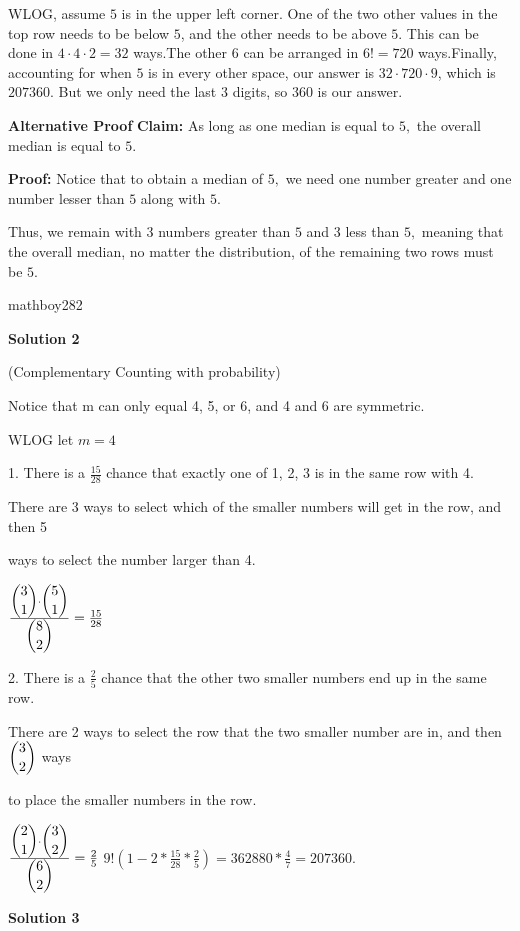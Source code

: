 \begin{enumerate}
 WLOG, assume $5$ is in the upper left corner. One of the two other values in the top row needs to be below $5$, and the other needs to be above $5$. This can be done in $4\cdot4\cdot2=32$ ways.The other $6$ can be arranged in $6!=720$ ways.Finally, accounting for when $5$ is in every other space, our answer is $32\cdot720\cdot9$, which is $207360$. But we only need the last $3$ digits, so $\boxed{360}$ is our answer.

 \textbf{Alternative Proof} \textbf{Claim:} As long as one median is equal to $5,$ the overall median is equal to $5.$

 \textbf{Proof:} Notice that to obtain a median of $5,$ we need one number greater and one number lesser than $5$ along with $5.$

 Thus, we remain with 3 numbers greater than $5$ and 3 less than $5,$ meaning that the overall median, no matter the distribution, of the remaining two rows must be $5.$

 mathboy282

 



\textbf{Solution 2}

(Complementary Counting with probability)

 Notice that m can only equal 4, 5, or 6, and 4 and 6 are symmetric. 

 WLOG let $m=4$

 1. There is a $\frac{15}{28}$ chance that exactly one of 1, 2, 3 is in the same row with 4.

 There are 3 ways to select which of the smaller numbers will get in the row, and then 5 

 ways to select the number larger than 4.

 $\frac{\dbinom{3}{1}\cdot\dbinom{5}{1}}{\dbinom{8}{2}} = \frac{15}{28}$

 2. There is a $\frac{2}{5}$ chance that the other two smaller numbers end up in the same row.

 There are 2 ways to select the row that the two smaller number are in, and then $\dbinom{3}{2}$ ways 

 to place the smaller numbers in the row.

 $\frac{\dbinom{2}{1}\cdot\dbinom{3}{2}}{\dbinom{6}{2}} = \frac{2}{5}$
$9!(1-2*\frac{15}{28}*\frac{2}{5})=362880*\frac{4}{7}=207\boxed{360}$.

 



\textbf{Solution 3}


\end{enumerate}
